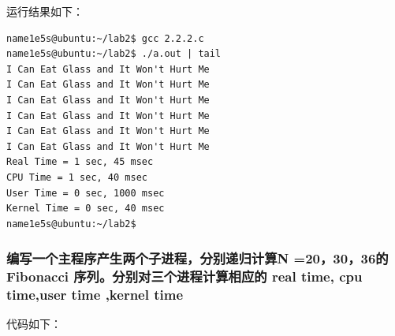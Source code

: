 \documentclass[blue,normal,cn]{elegantnote}
\begin{document}
运行结果如下：

\begin{lstlisting}
name1e5s@ubuntu:~/lab2$ gcc 2.2.2.c
name1e5s@ubuntu:~/lab2$ ./a.out | tail
I Can Eat Glass and It Won't Hurt Me
I Can Eat Glass and It Won't Hurt Me
I Can Eat Glass and It Won't Hurt Me
I Can Eat Glass and It Won't Hurt Me
I Can Eat Glass and It Won't Hurt Me
I Can Eat Glass and It Won't Hurt Me
Real Time = 1 sec, 45 msec
CPU Time = 1 sec, 40 msec
User Time = 0 sec, 1000 msec
Kernel Time = 0 sec, 40 msec
name1e5s@ubuntu:~/lab2$
\end{lstlisting}

\subsubsection{编写一个主程序产生两个子进程，分别递归计算N =20，30，36的 Fibonacci 序列。分别对三个进程计算相应的 real time, cpu time,user time ,kernel time}

代码如下：
\end{document}
